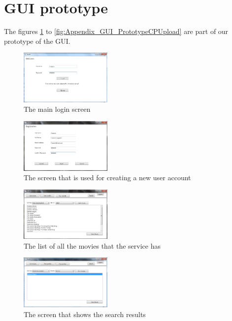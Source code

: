 \section{GUI prototype}
\label{Appendix_GUI_Prototype}
The figures \ref{fig:Appendix_GUI_PrototypeLogin} to \ref{fig:Appendix_GUI_PrototypeCPUpload} are part of our prototype of the GUI.
\begin{figure}[!ht]
  \centering
    \includegraphics[width=0.4\textwidth]{Parts/Appendix/Images/Login}
  \caption{The main login screen}
  \label{fig:Appendix_GUI_PrototypeLogin}
\end{figure}
\begin{figure}[!ht]
  \centering
    \includegraphics[width=0.4\textwidth]{Parts/Appendix/Images/Signup}
  \caption{The screen that is used for creating a new user account}
  \label{fig:Appendix_GUI_PrototypeSignup}
\end{figure}
\begin{figure}[!ht]
  \centering
    \includegraphics[width=0.4\textwidth]{Parts/Appendix/Images/Listmovies}
  \caption{The list of all the movies that the service has}
  \label{fig:Appendix_GUI_PrototypeAllmovies}
\end{figure}
\begin{figure}[h!]
  \centering
    \includegraphics[width=0.4\textwidth]{Parts/Appendix/Images/Search}
  \caption{The screen that shows the search results}
  \label{fig:Appendix_GUI_PrototypeSearch}
\end{figure}
